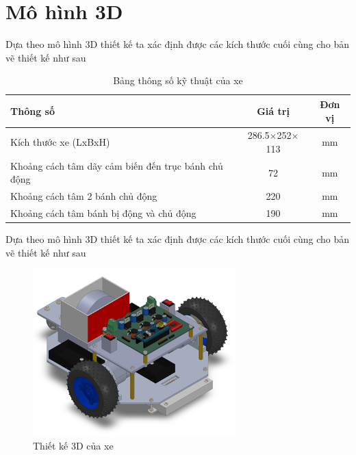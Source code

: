     \section{Mô hình 3D}
        \begin{table}[h!]
        \hspace*{0.6cm}Dựa theo mô hình 3D thiết kế ta xác định được các kích thước cuối cùng cho bản vẽ thiết kế như sau
         \begin{table}[h!]
            \centering
            \caption{Bảng thông số kỹ thuật của xe}
            \begin{tabular}{|l|c|c|}
                \hline
                \textbf{Thông số} & \textbf{Giá trị} & \textbf{Đơn vị} \\ \hline
                Kích thước xe (LxBxH) & 286.5$\times$252$\times$113 & mm \\ \hline
                Khoảng cách tâm dãy cảm biến đến trục bánh chủ động & 72 & mm \\ \hline
                Khoảng cách tâm 2 bánh chủ động & 220 & mm \\ \hline
                Khoảng cách tâm bánh bị động và chủ động & 190 & mm \\ \hline
            \end{tabular}
        \end{table}
        \hspace*{0.6cm}Dựa theo mô hình 3D thiết kế ta xác định được các kích thước cuối cùng cho bản vẽ thiết kế như sau
        \begin{figure}[H]
            \centering
            \includegraphics[width=0.7\textwidth]{pictures/chapter3/3d.png}
            \caption{Thiết kế 3D của xe}
            \label{3d}
        \end{figure}
        \begin{figure}[H]

\end{figure}
\end{table}
